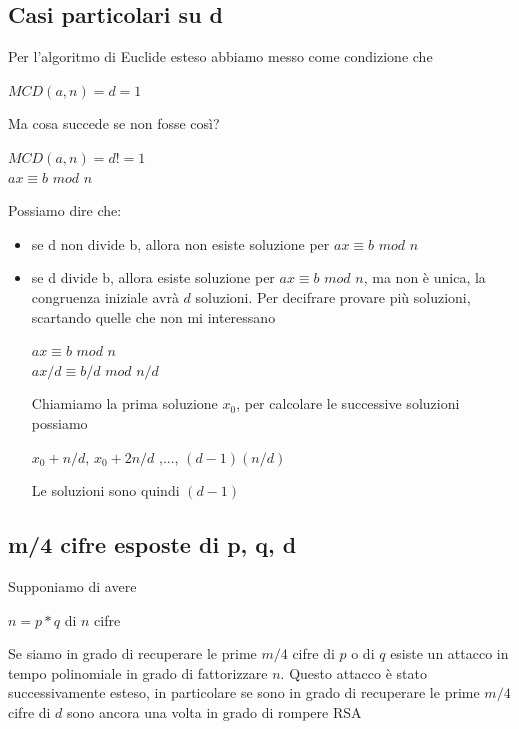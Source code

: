 \documentclass[11pt, oneside]{article}   	%
\begin{document}
\subsection*{Casi particolari su d}
Per l'algoritmo di Euclide esteso abbiamo messo come condizione che \begin{center}
$MCD(a,n) = d = 1$
\end{center}
Ma cosa succede se non fosse così?
\begin{center}
$MCD(a,n) = d != 1$\\
$ax \equiv b$ $mod$ $n$
\end{center}
Possiamo dire che:\begin{itemize}
\item se d non divide b, allora non esiste soluzione per $ax \equiv b$ $mod$ $n$
\item se d divide b, allora esiste soluzione per $ax \equiv b$ $mod$ $n$, ma non è unica, la congruenza iniziale avrà $d$ soluzioni. Per decifrare provare più soluzioni, scartando quelle che non mi interessano
\begin{center}
$ax \equiv b$ $mod$ $n$\\
$ax/d \equiv b/d$ $mod$ $n/d$
\end{center}
Chiamiamo la prima soluzione $x_0$, per calcolare le successive soluzioni possiamo
\begin{center}
$x_0 + n/d$, $x_0 + 2n/d$ ,..., $(d-1)(n/d)$
\end{center}
Le soluzioni sono quindi $(d-1)$

\end{itemize}

\subsection*{m/4 cifre esposte di p, q, d}
Supponiamo di avere\begin{center}
$n = p * q $ di $n$ cifre
\end{center}
Se siamo in grado di recuperare le prime $m/4$ cifre di $p$ o di $q$ esiste un attacco in tempo polinomiale in grado di fattorizzare $n$. Questo attacco è stato successivamente esteso, in particolare se sono in grado di recuperare le prime $m/4$ cifre di $d$  sono ancora una volta in grado di rompere RSA
\end{document}
